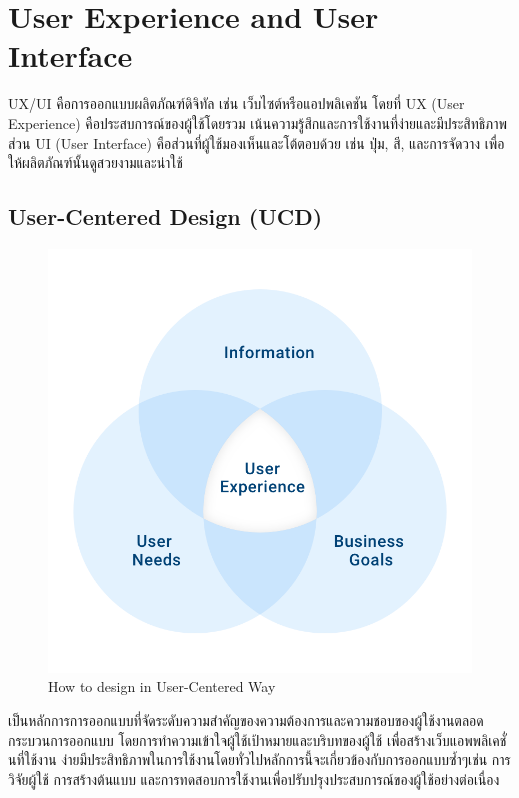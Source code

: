 \section{User Experience and User Interface}
  \qquad UX/UI คือการออกแบบผลิตภัณฑ์ดิจิทัล เช่น เว็บไซต์หรือแอปพลิเคชัน
  โดยที่ UX (User Experience) คือประสบการณ์ของผู้ใช้โดยรวม เน้นความรู้สึกและการใช้งานที่ง่ายและมีประสิทธิภาพ
  ส่วน UI (User Interface) คือส่วนที่ผู้ใช้มองเห็นและโต้ตอบด้วย เช่น ปุ่ม, สี, และการจัดวาง เพื่อให้ผลิตภัณฑ์นั้นดูสวยงามและน่าใช้
  \subsection{User-Centered Design (UCD)}
    \begin{figure}[h!]
      \begin{center}
        \includegraphics[scale=0.25]{image/Background/UDC.png}
      \end{center}
      \caption[User-Centered Design]{How to design in User-Centered Way}
      \label{fig:udc_pic}
    \end{figure}
    \FloatBarrier
    \qquad เป็นหลักการการออกแบบที่จัดระดับความสําคัญของความต้องการและความชอบของผู้ใช้งานตลอดกระบวนการออกแบบ โดยการทําความเข้าใจผู้ใช้เป้าหมายและบริบทของผู้ใช้ เพื่อสร้างเว็บแอพพลิเคชั่นที่ใช้งาน ง่ายมีประสิทธิภาพในการใช้งานโดยทั่วไปหลักการนี้จะเกี่ยวข้องกับการออกแบบซํ้าๆเช่น การวิจัยผู้ใช้ การสร้างต้นแบบ และการทดสอบการใช้งานเพื่อปรับปรุงประสบการณ์ของผู้ใช้อย่างต่อเนื่อง \cite{UCD1}\cite{UCD2}

